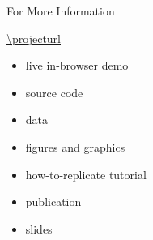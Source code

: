 \appendix

\appendix

\begin{frame}{For More Information}

\vspace{1ex}

\begin{adjustbox}{width=\textwidth,center}%
{\HUGE\url{\projecturl}}%
\end{adjustbox}

\vspace{3ex}

\begin{itemize}
\item live in-browser demo
\item source code
\item data
\item figures and graphics
\item how-to-replicate tutorial
\item publication
\item slides
\end{itemize}

\end{frame}

